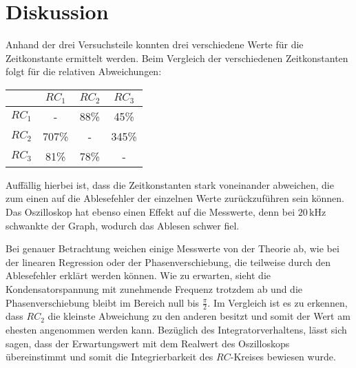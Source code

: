 \section{Diskussion}

\begin{flushleft}
    Anhand der drei Versuchsteile konnten drei verschiedene Werte für die Zeitkonstante ermittelt werden.
    Beim Vergleich der verschiedenen Zeitkonstanten folgt für die relativen Abweichungen:
\end{flushleft}

\begin{table}[H]
    \centering
    \label{Tabelle3}
    \begin{tabular} {c||  c|  c|  c}
        \toprule
        {$  $} &
        {$ RC_{1} $} &
        {$ RC_{2} $} &
        {$ RC_{3} $} \\
        \midrule
        $RC_{1}$ &   -   & 88\% & 45\%  \\
        $RC_{2}$ & 707\% &  -   & 345\% \\
        $RC_{3}$ & 81\%  & 78\% &  - \\
        \bottomrule
    \end{tabular} 
\end{table}

\begin{flushleft}
    Auffällig hierbei ist, dass die Zeitkonstanten stark voneinander abweichen, die zum einen auf die Ablesefehler der einzelnen Werte zurückzuführen sein können.
    Das Oszilloskop hat ebenso einen Effekt auf die Messwerte, denn bei $20\,\unit{\kilo\hertz}$ schwankte der Graph, wodurch das Ablesen schwer fiel.
\end{flushleft}

\begin{flushleft}
    Bei genauer Betrachtung weichen einige Messwerte von der Theorie ab, wie bei der linearen Regression oder der Phasenverschiebung, die teilweise durch den Ablesefehler erklärt werden können.
    Wie zu erwarten, sieht die Kondensatorspannung mit zunehmende Frequenz trotzdem ab und die Phasenverschiebung bleibt im Bereich null bis $\frac{\pi}{2}$.
    Im Vergleich ist es zu erkennen, dass $RC_{2}$ die kleinste Abweichung zu den anderen besitzt und somit der Wert am ehesten angenommen werden kann.
    Bezüglich des Integratorverhaltens, lässt sich sagen, dass der Erwartungswert mit dem Realwert des Oszilloskops übereinstimmt und somit die Integrierbarkeit des $RC$-Kreises bewiesen wurde.
\end{flushleft}